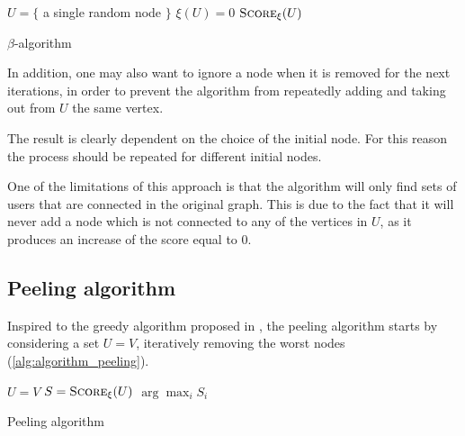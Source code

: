 \begin{algorithm}
	\SetAlgoLined
	$U = \{$ a single random node $\}$\;
	$\xi(U) = 0$ \;
	\Return $\textsc{Score}_{\xi} (U)$ \;
	\caption{$\beta$-algorithm}
	\label{alg:algorithm_beta}
\end{algorithm}

In addition, one may also want to ignore a node when it is removed for the
next iterations, in order to prevent the algorithm from repeatedly adding
and taking out from $U$ the same vertex.

The result is clearly dependent on the choice of the initial node. For this
reason the process should be repeated for different initial nodes.

One of the limitations of this approach is that the algorithm will only find
sets of users that are connected in the original graph. This is due to the fact
that it will never add a node which is not connected to any of the vertices in
$U$, as it produces an increase of the score equal to $0$.

\subsection{Peeling algorithm}%
\label{ssub:peeling_algorithm}

Inspired to the greedy algorithm proposed in \cite{charikar2000greedy}, the
peeling
algorithm starts by considering a set $U = V$,
iteratively removing the worst nodes (\autoref{alg:algorithm_peeling}).

\begin{algorithm}
	\SetAlgoLined
	$U = V$\;
	$S = \textsc{Score}_{\xi}(U)$ \;
	\Return $\arg\max_{i}S_i$ \;

	\caption{Peeling algorithm}
	\label{alg:algorithm_peeling}
\end{algorithm}

